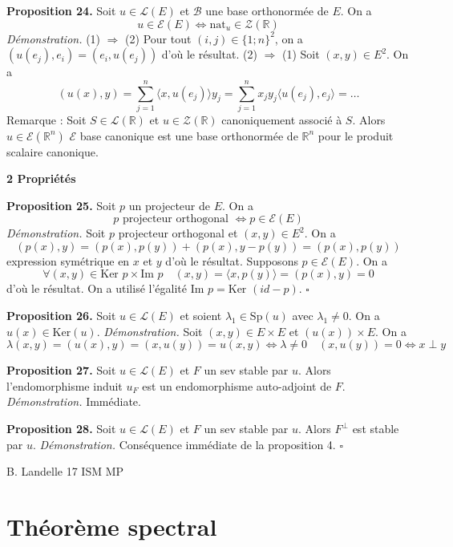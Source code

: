 \textbf{Proposition 24.} Soit $u \in \mathcal{L}(E)$ et $\mathcal{B}$ une base orthonormée de $E$. On a
\[ u \in \mathcal{E}(E) \iff \text{nat}_{u} \in \mathcal{Z}(\mathbb{R}) \]
\textit{Démonstration.} (1) $\Rightarrow$ (2) Pour tout $(i,j) \in \{1; n\}^2$, on a $(u(e_j), e_i) = (e_i, u(e_j))$ d'où le résultat.
(2) $\Rightarrow$ (1) Soit $(x,y) \in E^2$. On a
\[ (u(x), y) = \sum_{j=1}^n \langle x, u(e_j) \rangle y_j = \sum_{j=1}^n x_j y_j \langle u(e_j), e_j \rangle = \dots \]
Remarque : Soit $S \in \mathcal{L}(\mathbb{R})$ et $u \in \mathcal{Z}(\mathbb{R})$ canoniquement associé à $S$. Alors $u \in \mathcal{E}(\mathbb{R}^n)$
$\mathcal{E}$ base canonique est une base orthonormée de $\mathbb{R}^n$ pour le produit scalaire canonique.

\textbf{2 Propriétés}

\textbf{Proposition 25.} Soit $p$ un projecteur de $E$. On a
\[ p \text{ projecteur orthogonal } \iff p \in \mathcal{E}(E) \]
\textit{Démonstration.} Soit $p$ projecteur orthogonal et $(x,y) \in E^2$. On a
\[ (p(x), y) = (p(x), p(y)) + (p(x), y - p(y)) = (p(x), p(y)) \]
expression symétrique en $x$ et $y$ d'où le résultat. Supposons $p \in \mathcal{E}(E)$. On a
\[ \forall (x,y) \in \text{Ker } p \times \text{Im } p \quad (x,y) = \langle x, p(y) \rangle = (p(x), y) = 0 \]
d'où le résultat. On a utilisé l'égalité $\text{Im } p = \text{Ker } (id - p)$. $\square$

\textbf{Proposition 26.} Soit $u \in \mathcal{L}(E)$ et soient $\lambda_1 \in \text{Sp}(u)$ avec $\lambda_1 \neq 0$. On a $u(x) \in \text{Ker}(u)$.
\textit{Démonstration.} Soit $(x,y) \in E \times E$ et $(u(x)) \times E$. On a
\[ \lambda (x,y) = (u(x), y) = (x, u(y)) = u(x,y) \iff \lambda \neq 0 \quad (x, u(y)) = 0 \iff x \perp y \]

\textbf{Proposition 27.} Soit $u \in \mathcal{L}(E)$ et $F$ un sev stable par $u$. Alors l'endomorphisme induit $u_F$ est un endomorphisme auto-adjoint de $F$.
\textit{Démonstration.} Immédiate.

\textbf{Proposition 28.} Soit $u \in \mathcal{L}(E)$ et $F$ un sev stable par $u$. Alors $F^{\perp}$ est stable par $u$.
\textit{Démonstration.} Conséquence immédiate de la proposition 4. $\square$

\vspace{1cm}
B. Landelle \hspace{2cm} 17 \hspace{2cm} ISM MP

\section{Théorème spectral}

